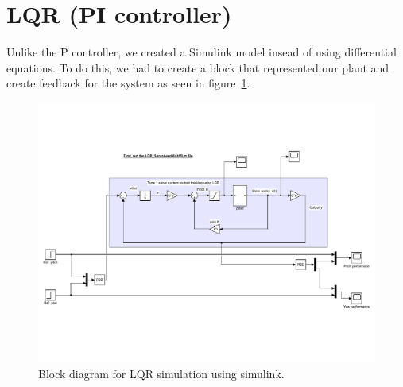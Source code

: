 \section{LQR (PI controller)}
Unlike the P controller, we created a Simulink model insead of using differential equations.  To do this, we had to create a block that represented our plant and create feedback for the system as seen in figure~\ref{fig:LQR_Sim_Block_Diagram}.  
\begin{figure}[!htbp]
    \centering
    \includegraphics[width=.8\textwidth,keepaspectratio=true]{figs/img/LQR_Simulink_Sim}
    \caption{Block diagram for LQR simulation using simulink.}
    \label{fig:LQR_Sim_Block_Diagram}
\end{figure}
